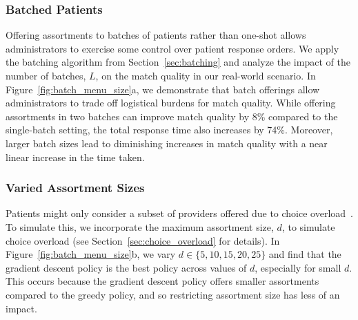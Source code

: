 \subsubsection{Batched Patients}
\label{sec:batched_patients}
\begin{figure*}
    \centering 
    
    \caption{(a) Offering patients in two batches improves match quality by 7\% while increasing response time by 90\%. Beyond two batches, the increases in match quality are diminishing. (b) We simulate cognitive overload by assuming patients consider up to $d$ options. Smaller $d$ favors the gradient descent policy because it offers carefully tailored assortments without being too large. (c) While the gradient descent policy maximizes match quality, it achieves worse fairness because it neglects the worst-off patient. In contrast, pairwise and group-based policies achieve higher fairness by only suggesting high-quality matches.} 
    \label{fig:batch_menu_size}
\end{figure*}
Offering assortments to batches of patients rather than one-shot allows administrators to exercise some control over patient response orders. 
We apply the batching algorithm from Section~\ref{sec:batching} and analyze the impact of the number of batches, $L$, on the match quality in our real-world scenario. 
In Figure~\ref{fig:batch_menu_size}a, we demonstrate that batch offerings allow administrators to trade off logistical burdens for match quality. 
While offering assortments in two batches can improve match quality by 8\% compared to the single-batch setting, the total response time also increases by 74\%. 
Moreover, larger batch sizes lead to diminishing increases in match quality with a near linear increase in the time taken. 

\subsubsection{Varied Assortment Sizes}
\label{sec:menu_size}
Patients might only consider a subset of providers offered due to choice overload~\citep{choice_overload}. 
To simulate this, we incorporate the maximum assortment size, $d$, to simulate choice overload (see Section~\ref{sec:choice_overload} for details). 
In Figure~\ref{fig:batch_menu_size}b, we vary $d \in \{5,10,15,20,25\}$ and find that the gradient descent policy is the best policy across values of $d$, especially for small $d$. 
This occurs because the gradient descent policy offers smaller assortments compared to the greedy policy, and so restricting assortment size has less of an impact. 


